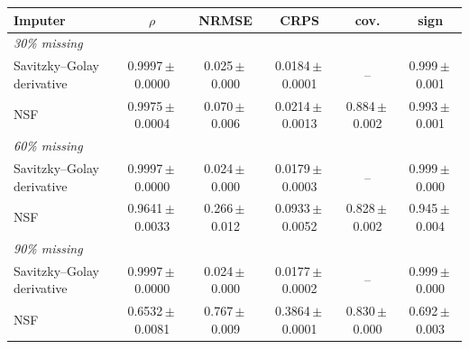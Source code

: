 \begin{tabular}{lccccc}
\toprule
Imputer & $\rho$ & NRMSE & CRPS & cov. & sign\\
\midrule
\multicolumn{6}{l}{\textit{30\% missing}}\\
Savitzky--Golay derivative & 0.9997\,$\pm$\,0.0000 & 0.025\,$\pm$\,0.000 & 0.0184\,$\pm$\,0.0001 & -- & 0.999\,$\pm$\,0.001\\
NSF & 0.9975\,$\pm$\,0.0004 & 0.070\,$\pm$\,0.006 & 0.0214\,$\pm$\,0.0013 & 0.884\,$\pm$\,0.002 & 0.993\,$\pm$\,0.001\\
\midrule
\multicolumn{6}{l}{\textit{60\% missing}}\\
Savitzky--Golay derivative & 0.9997\,$\pm$\,0.0000 & 0.024\,$\pm$\,0.000 & 0.0179\,$\pm$\,0.0003 & -- & 0.999\,$\pm$\,0.000\\
NSF & 0.9641\,$\pm$\,0.0033 & 0.266\,$\pm$\,0.012 & 0.0933\,$\pm$\,0.0052 & 0.828\,$\pm$\,0.002 & 0.945\,$\pm$\,0.004\\
\midrule
\multicolumn{6}{l}{\textit{90\% missing}}\\
Savitzky--Golay derivative & 0.9997\,$\pm$\,0.0000 & 0.024\,$\pm$\,0.000 & 0.0177\,$\pm$\,0.0002 & -- & 0.999\,$\pm$\,0.000\\
NSF & 0.6532\,$\pm$\,0.0081 & 0.767\,$\pm$\,0.009 & 0.3864\,$\pm$\,0.0001 & 0.830\,$\pm$\,0.000 & 0.692\,$\pm$\,0.003\\
\bottomrule
\end{tabular}
